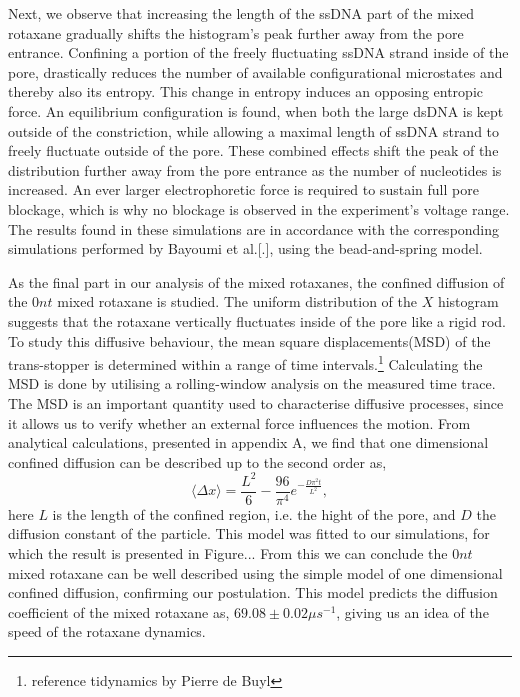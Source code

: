 Next, we observe that increasing the length of the ssDNA part of the mixed rotaxane
gradually shifts the histogram's peak further away from the pore entrance. Confining a
portion of the freely fluctuating ssDNA strand inside of the pore,
drastically reduces the number of available configurational microstates and thereby also
its entropy. This change in entropy induces an opposing entropic force.
An equilibrium configuration is found, when both the large dsDNA is kept outside of the
constriction, while allowing a maximal length of ssDNA strand to freely fluctuate outside
of the pore. These combined effects shift the peak of the distribution further away from
the pore entrance as the number of nucleotides is increased. An ever larger
electrophoretic force is required to sustain full pore blockage, which is why no blockage
is observed in the experiment's voltage range. The results found in these simulations are
in accordance with the corresponding simulations performed by Bayoumi et al.[.], using
the bead-and-spring model.

As the final part in our analysis of the mixed rotaxanes, the confined diffusion of the
$0nt$ mixed rotaxane is studied. The uniform distribution of the $X$ histogram suggests
that the rotaxane vertically fluctuates inside of the pore like a rigid rod. To study
this diffusive behaviour, the mean square displacements(MSD) of the
trans-stopper is determined within a range of time intervals.\footnote{reference
tidynamics by Pierre de Buyl} Calculating the MSD is done by utilising a rolling-window
analysis on the measured time trace. The MSD is an important quantity used to
characterise diffusive processes, since it allows us to verify whether an external force
influences the motion. From analytical calculations, presented in appendix A, we find
that one dimensional confined diffusion can be described up to the second order as,
\begin{equation*}
\langle \Delta x \rangle = \frac{L^2}{6} - \frac{96}{\pi^4} e^{-\frac{D \pi^2t
}{L^2}},
\end{equation*}
here $L$ is the length of the confined region, i.e. the hight of the pore, and $D$ the
diffusion constant of the particle. This model was fitted to our simulations, for which
the result is presented in Figure... From this we can conclude the $0nt$ mixed rotaxane
can be well described using the simple model of one dimensional confined diffusion,
confirming our postulation. This model predicts the diffusion coefficient of the mixed
rotaxane as, $69.08 \pm 0.02 \mu s^{-1}$, giving us an idea of the speed of the
rotaxane dynamics.

